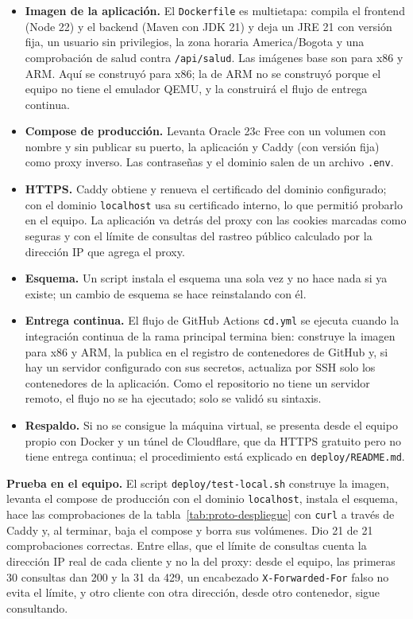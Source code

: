 \begin{itemize}[itemsep=2pt]
  \item \textbf{Imagen de la aplicación.} El \texttt{Dockerfile} es multietapa:
        compila el frontend (Node 22) y el backend (Maven con JDK 21) y deja un
        JRE 21 con versión fija, un usuario sin privilegios, la zona horaria
        America/Bogota y una comprobación de salud contra \texttt{/api/salud}.
        Las imágenes base son para x86 y ARM. Aquí se construyó para x86; la de
        ARM no se construyó porque el equipo no tiene el emulador QEMU, y la
        construirá el flujo de entrega continua.
  \item \textbf{Compose de producción.} Levanta Oracle 23c Free con un volumen
        con nombre y sin publicar su puerto, la aplicación y Caddy (con versión
        fija) como proxy inverso. Las contraseñas y el dominio salen de un
        archivo \texttt{.env}.
  \item \textbf{HTTPS.} Caddy obtiene y renueva el certificado del dominio
        configurado; con el dominio \texttt{localhost} usa su certificado
        interno, lo que permitió probarlo en el equipo. La aplicación va detrás
        del proxy con las cookies marcadas como seguras y con el límite de
        consultas del rastreo público calculado por la dirección IP que agrega
        el proxy.
  \item \textbf{Esquema.} Un script instala el esquema una sola vez y no hace
        nada si ya existe; un cambio de esquema se hace reinstalando con él.
  \item \textbf{Entrega continua.} El flujo de GitHub Actions \texttt{cd.yml}
        se ejecuta cuando la integración continua de la rama principal termina
        bien: construye la imagen para x86 y ARM, la publica en el registro de
        contenedores de GitHub y, si hay un servidor configurado con sus
        secretos, actualiza por SSH solo los contenedores de la aplicación. Como
        el repositorio no tiene un servidor remoto, el flujo no se ha ejecutado;
        solo se validó su sintaxis.
  \item \textbf{Respaldo.} Si no se consigue la máquina virtual, se presenta
        desde el equipo propio con Docker y un túnel de Cloudflare, que da
        HTTPS gratuito pero no tiene entrega continua; el procedimiento está
        explicado en \texttt{deploy/README.md}.
\end{itemize}

\textbf{Prueba en el equipo.} El script \texttt{deploy/test-local.sh}
construye la imagen, levanta el compose de producción con el dominio
\texttt{localhost}, instala el esquema, hace las comprobaciones de la
tabla~\ref{tab:proto-despliegue} con \texttt{curl} a través de Caddy y, al terminar,
baja el compose y borra sus volúmenes. Dio 21 de 21 comprobaciones correctas.
Entre ellas, que el límite de consultas cuenta la dirección IP real de cada
cliente y no la del proxy: desde el equipo, las primeras 30 consultas dan 200 y la
31 da 429, un encabezado \texttt{X-Forwarded-For} falso no evita el límite, y
otro cliente con otra dirección, desde otro contenedor, sigue consultando.

